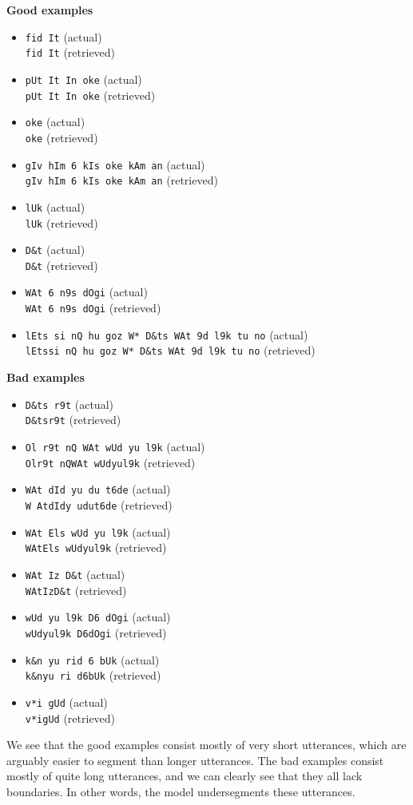 \begin{multicols}{2}
\noindent\textbf{Good examples}

\begin{itemize}
\item \texttt{fid It} (actual)\\ \texttt{fid It} (retrieved)
\item \texttt{pUt It In oke} (actual)\\ \texttt{pUt It In oke} (retrieved)
\item \texttt{oke} (actual)\\ \texttt{oke} (retrieved)
\item \texttt{gIv hIm 6 kIs oke kAm an} (actual)\\ \texttt{gIv hIm 6 kIs oke kAm an} (retrieved)
\item \texttt{lUk} (actual)\\ \texttt{lUk} (retrieved)
\item \texttt{D\&t} (actual)\\ \texttt{D\&t} (retrieved)
\item \texttt{WAt 6 n9s dOgi} (actual)\\ \texttt{WAt 6 n9s dOgi} (retrieved)
\item \texttt{lEts si nQ hu goz W* D\&ts WAt 9d l9k tu no} (actual)\\ \texttt{lEtssi nQ hu goz W* D\&ts WAt 9d l9k tu no} (retrieved)
\end{itemize}
\vfill
\columnbreak
\noindent\textbf{Bad examples}

\begin{itemize}
\item \texttt{D\&ts r9t} (actual)\\ \texttt{D\&tsr9t} (retrieved)
\item \texttt{Ol r9t nQ WAt wUd yu l9k} (actual)\\ \texttt{Olr9t nQWAt wUdyul9k} (retrieved)
\item \texttt{WAt dId yu du t6de} (actual)\\ \texttt{W AtdIdy udut6de} (retrieved)
\item \texttt{WAt Els wUd yu l9k} (actual)\\ \texttt{WAtEls wUdyul9k} (retrieved)
\item \texttt{WAt Iz D\&t} (actual)\\ \texttt{WAtIzD\&t} (retrieved)
\item \texttt{wUd yu l9k D6 dOgi} (actual)\\ \texttt{wUdyul9k D6dOgi} (retrieved)
\item \texttt{k\&n yu rid 6 bUk} (actual)\\ \texttt{k\&nyu ri d6bUk} (retrieved)
\item \texttt{v*i gUd} (actual)\\ \texttt{v*igUd} (retrieved)
\end{itemize}

\end{multicols}

We see that the good examples consist mostly of very short utterances, which are arguably easier to segment than longer utterances. The bad examples consist mostly of quite long utterances, and we can clearly see that they all lack boundaries. In other words, the model undersegments these utterances.
